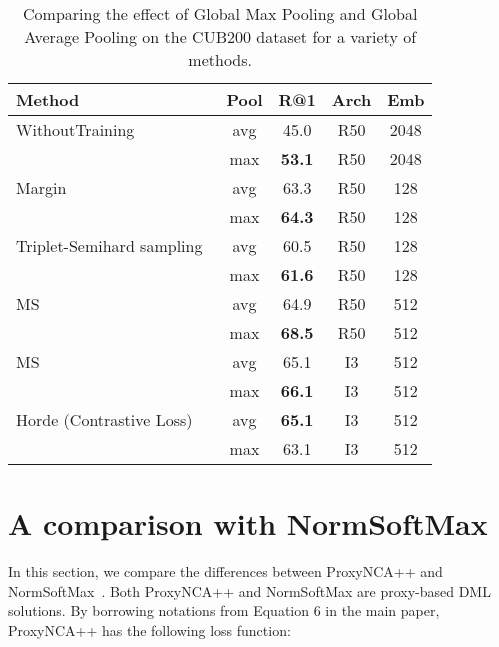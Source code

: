 \documentclass[runningheads]{llncs}
\begin{document}
\begin{table}[htb]
\centering
\caption{Comparing the effect of Global Max Pooling and Global Average Pooling on the CUB200 dataset for a variety of methods. 
}
\setlength{\tabcolsep}{3pt}
\begin{tabular}{|lcccc|}
\hline
Method & Pool & R@1 & Arch & Emb \\ \hline
\small{WithoutTraining} & avg & 45.0 & \small{R50}& \small{2048}\\
 & max & \textbf{53.1} & \small{R50}& \small{2048}\\
\hline
\small{Margin~\cite{wu2017sampling}} & avg & 63.3 & \small{R50}& \small{128}\\
 & max & \textbf{64.3} & \small{R50}& \small{128}\\
\hline
\small{Triplet-Semihard sampling~\cite{Schroff_2015_CVPR}} & avg & 60.5 & \small{R50}& \small{128}\\
 & max & \textbf{61.6} & \small{R50}& \small{128}\\
\hline
\small{MS~\cite{wang2019multi}} & avg & 64.9 & \small{R50}& \small{512}\\
 & max & \textbf{68.5} & \small{R50}& \small{512}\\
 \hline
 \small{MS~\cite{wang2019multi}} & avg & 65.1 & \small{I3}& \small{512}\\
 & max & \textbf{66.1} & \small{I3}& \small{512}\\
\hline
\small{Horde (Contrastive Loss)~\cite{jacob2019metric}} & avg & \textbf{65.1} & \small{I3}& \small{512}\\
 & max & 63.1 & \small{I3}& \small{512}\\
\hline
\end{tabular}

\label{table:max_other}
\end{table}


\clearpage




\section{A comparison with NormSoftMax~\cite{zhai2019}}

In this section, we compare the differences between ProxyNCA++ and NormSoftMax~\cite{zhai2019}. Both ProxyNCA++ and NormSoftMax are proxy-based DML solutions. By borrowing notations from Equation 6 in the main paper, ProxyNCA++ has the following loss function: 
\end{document}
